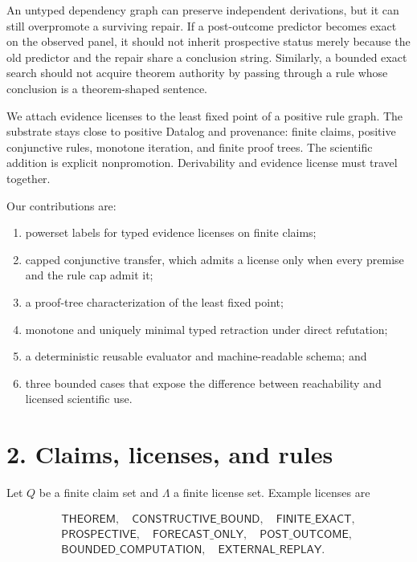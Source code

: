 \documentclass[
  11pt,
]{article}
\providecommand{\tightlist}{%
  \setlength{\itemsep}{0pt}\setlength{\parskip}{0pt}}
\begin{document}
An untyped dependency graph can preserve independent derivations, but it
can still overpromote a surviving repair. If a post-outcome predictor
becomes exact on the observed panel, it should not inherit prospective
status merely because the old predictor and the repair share a
conclusion string. Similarly, a bounded exact search should not acquire
theorem authority by passing through a rule whose conclusion is a
theorem-shaped sentence.

We attach evidence licenses to the least fixed point of a positive rule
graph. The substrate stays close to positive Datalog and provenance:
finite claims, positive conjunctive rules, monotone iteration, and
finite proof trees. The scientific addition is explicit nonpromotion.
Derivability and evidence license must travel together.

Our contributions are:

\begin{enumerate}
\def\labelenumi{\arabic{enumi}.}
\tightlist
\item
  powerset labels for typed evidence licenses on finite claims;
\item
  capped conjunctive transfer, which admits a license only when every
  premise and the rule cap admit it;
\item
  a proof-tree characterization of the least fixed point;
\item
  monotone and uniquely minimal typed retraction under direct
  refutation;
\item
  a deterministic reusable evaluator and machine-readable schema; and
\item
  three bounded cases that expose the difference between reachability
  and licensed scientific use.
\end{enumerate}

\hypertarget{claims-licenses-and-rules}{%
\section{2. Claims, licenses, and
rules}\label{claims-licenses-and-rules}}

Let \(Q\) be a finite claim set and \(\Lambda\) a finite license set.
Example licenses are

\[
\begin{gathered}
\textsf{THEOREM}, \quad \textsf{CONSTRUCTIVE\_BOUND}, \quad
\textsf{FINITE\_EXACT}, \\
\textsf{PROSPECTIVE}, \quad \textsf{FORECAST\_ONLY}, \quad
\textsf{POST\_OUTCOME}, \\
\textsf{BOUNDED\_COMPUTATION}, \quad \textsf{EXTERNAL\_REPLAY}.
\end{gathered}
\]
\end{document}
